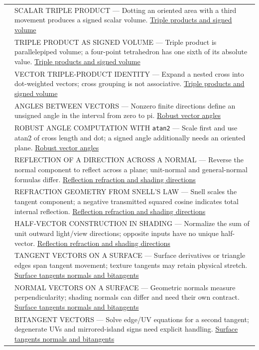 {\begin{longtable}[]{@{}
  >{\raggedright\arraybackslash}p{}
  >{\raggedright\arraybackslash}p{}@{}}
548 & SCALAR TRIPLE PRODUCT --- Dotting an oriented area with a third movement produces a signed scalar volume. \hyperref[appendix-5caa058bd9c7]{Triple products and signed volume} \\
549 & TRIPLE PRODUCT AS SIGNED VOLUME --- Triple product is parallelepiped volume; a four-point tetrahedron has one sixth of its absolute value. \hyperref[appendix-5caa058bd9c7]{Triple products and signed volume} \\
550 & VECTOR TRIPLE-PRODUCT IDENTITY --- Expand a nested cross into dot-weighted vectors; cross grouping is not associative. \hyperref[appendix-5caa058bd9c7]{Triple products and signed volume} \\
551 & ANGLES BETWEEN VECTORS --- Nonzero finite directions define an unsigned angle in the interval from zero to pi. \hyperref[appendix-e569e60e18e6]{Robust vector angles} \\
552 & ROBUST ANGLE COMPUTATION WITH \texttt{atan2} --- Scale first and use atan2 of cross length and dot; a signed angle additionally needs an oriented plane. \hyperref[appendix-e569e60e18e6]{Robust vector angles} \\
553 & REFLECTION OF A DIRECTION ACROSS A NORMAL --- Reverse the normal component to reflect across a plane; unit-normal and general-normal formulas differ. \hyperref[appendix-44e00863b4d5]{Reflection refraction and shading directions} \\
554 & REFRACTION GEOMETRY FROM SNELL'S LAW --- Snell scales the tangent component; a negative transmitted squared cosine indicates total internal reflection. \hyperref[appendix-44e00863b4d5]{Reflection refraction and shading directions} \\
555 & HALF-VECTOR CONSTRUCTION IN SHADING --- Normalize the sum of unit outward light/view directions; opposite inputs have no unique half-vector. \hyperref[appendix-44e00863b4d5]{Reflection refraction and shading directions} \\
556 & TANGENT VECTORS ON A SURFACE --- Surface derivatives or triangle edges span tangent movement; texture tangents may retain physical stretch. \hyperref[appendix-e31893dec985]{Surface tangents normals and bitangents} \\
557 & NORMAL VECTORS ON A SURFACE --- Geometric normals measure perpendicularity; shading normals can differ and need their own contract. \hyperref[appendix-e31893dec985]{Surface tangents normals and bitangents} \\
558 & BITANGENT VECTORS --- Solve edge/UV equations for a second tangent; degenerate UVs and mirrored-island signs need explicit handling. \hyperref[appendix-e31893dec985]{Surface tangents normals and bitangents} \\

\end{longtable}}
